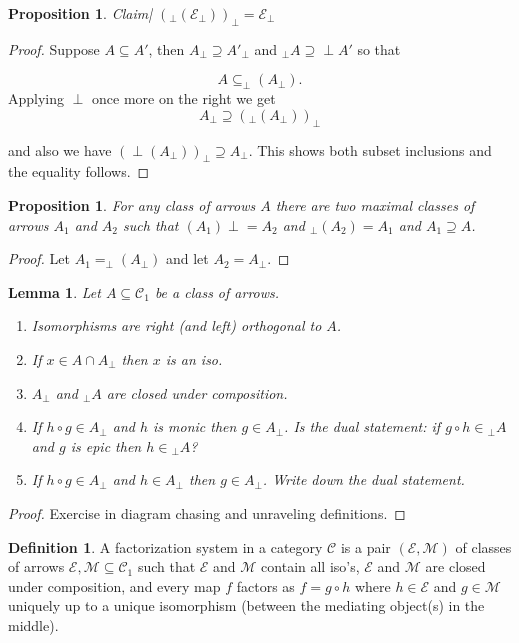 \documentclass[11pt]{amsart}
\theoremstyle{plain}
\newtheorem{prop}[thm]{Proposition}
\newtheorem{lem}[thm]{Lemma}
\theoremstyle{definition}
\newtheorem{defn}[thm]{Definition}
\newcommand{\cC}{{\mathcal C}}
\newcommand{\cE}{{\mathcal E}}
\newcommand{\cM}{{\mathcal M}}
\newcommand{\noi}{{\noindent}}
\begin{document}
\begin{prop}
Claim| $ ({_\perp}(\cE_\perp))_\perp = \cE_\perp$
\end{prop}
\begin{proof}
Suppose $A \subseteq A'$, then $A_\perp \supseteq A'_\perp$ and $_\perp A \supseteq \perp A'$ so that 

\[ A \subseteq _\perp(A_\perp). \]
\noi Applying $\perp$ once more on the right we get 
\[ A_\perp \supseteq (_\perp (A_\perp))_\perp \]

\noi and also we have $(\perp(A_\perp))_\perp \supseteq A_\perp$. This shows both subset inclusions and the equality follows. 
\end{proof}

\begin{prop}
For any class of arrows $A$ there are two maximal classes of arrows $A_1$ and $A_2$ such that $(A_1)\perp = A_2$ and $_\perp(A_2) = A_1$ and $A_1 \supseteq A$. 
\end{prop}
\begin{proof}
Let $A_1 = _\perp (A_\perp)$ and let $A_2 = A_\perp$. 
\end{proof}

\begin{lem}
  Let $A \subseteq \cC_1$ be a class of arrows.
\begin{enumerate}
\item Isomorphisms are right (and left) orthogonal to $A$. \medskip 
\item If $x \in A \cap A_\perp$ then $x$ is an iso. \medskip
\item $A_\perp$ and ${_\perp}A$ are closed under composition. \medskip
\item If $h \circ g \in A_\perp$ and $h$ is monic then $g \in A_\perp$. Is the dual statement: if $g \circ h \in {_\perp}A$ and $g$ is epic then $h \in  {_\perp}A$?  \medskip
\item If $h \circ g \in A_\perp$ and $h \in A_\perp$ then $g \in A_\perp$. Write down the dual statement. 
\end{enumerate}
\end{lem}
\begin{proof}
Exercise in diagram chasing and unraveling definitions. 
\end{proof}

\begin{defn}
A factorization system in a category $\cC$ is a pair $(\cE, \cM)$ of classes of arrows $\cE, \cM \subseteq \cC_1$ such that $\cE$ and $\cM$ contain all iso's, $\cE$ and $\cM$ are closed under composition, and every map $f$ factors as $f = g \circ h$ where $h \in \cE$ and $g \in \cM$ uniquely up to a unique isomorphism (between the mediating object(s) in the middle). 
\end{defn}
\end{document}
